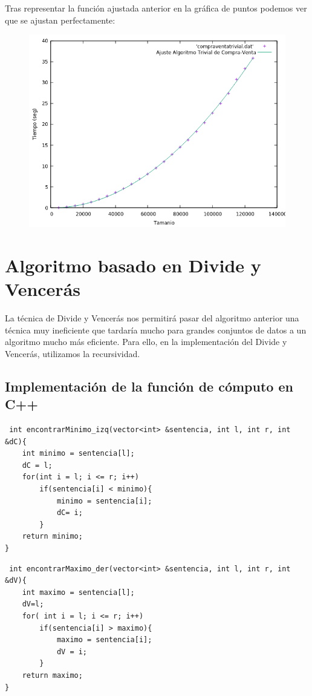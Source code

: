 \documentclass[12pt, spanish]{article}
\begin{document}
Tras representar la función ajustada anterior en la gráfica de puntos podemos ver que se ajustan perfectamente:
\begin{figure}[H]
  \centering
  \includegraphics[scale = 0.8]{ajustecompraventatrivial.png}
\end{figure}

\section{Algoritmo basado en Divide y Vencerás}
La técnica de Divide y Vencerás nos permitirá pasar del algoritmo anterior una técnica muy ineficiente que tardaría mucho para grandes conjuntos de datos a un algoritmo mucho más eficiente. Para ello, en la implementación del Divide  y Vencerás, utilizamos la recursividad. 
\subsection{Implementación de la función de cómputo en C++ }


\begin{verbatim}
 int encontrarMinimo_izq(vector<int> &sentencia, int l, int r, int &dC){
	int minimo = sentencia[l];
	dC = l;
	for(int i = l; i <= r; i++)
		if(sentencia[i] < minimo){
			minimo = sentencia[i];
			dC= i;
		}
	return minimo;
}
\end{verbatim}

\begin{verbatim}
 int encontrarMaximo_der(vector<int> &sentencia, int l, int r, int &dV){
	int maximo = sentencia[l];
	dV=l;
	for( int i = l; i <= r; i++)
		if(sentencia[i] > maximo){
			maximo = sentencia[i];
			dV = i;
		}
	return maximo;
}
\end{verbatim}
\end{document}
